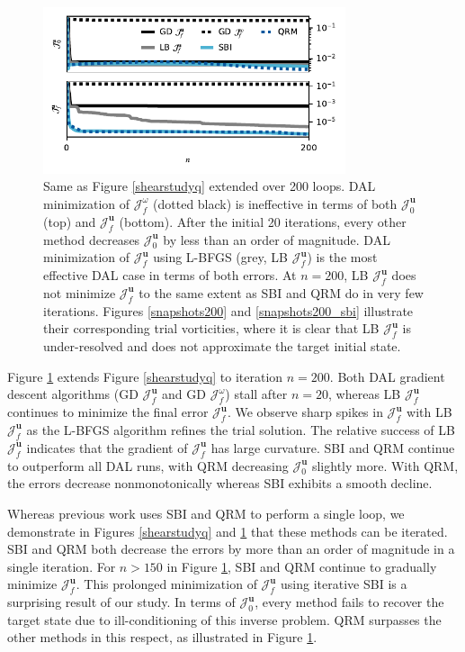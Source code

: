 \documentclass[%
 reprint,
 amsmath,amssymb,
 aps,
 pre,
]{revtex4-2}
\renewcommand{\vec}[1]{\boldsymbol{#1}}
\newcommand{\JUo}{\mathcal{J}^{\vec{u}}_0}
\newcommand{\JUf}{\mathcal{J}^{\vec{u}}_f}
\newcommand{\Jwf}{\mathcal{J}^{\omega}_f}
\begin{document}
\begin{figure}
  \includegraphics[width=3.5in]{PLT200DQ/both.pdf}
  \caption{Same as Figure \ref{shearstudyq} extended over 200 loops. 
  DAL minimization of $\Jwf$ (dotted black) is ineffective in terms of both $\JUo$ (top) and $\JUf$ (bottom).
  After the initial 20 iterations, every other method decreases $\JUo$ by less than an order of magnitude.
  DAL minimization of $\JUf$ using L-BFGS (grey, LB $\JUf$) is the most effective DAL case in terms of both errors.
  At $n=200$, LB $\JUf$ does not minimize $\JUf$ to the same extent as SBI and QRM do in very few iterations.
  Figures \ref{snapshots200} and \ref{snapshots200_sbi} illustrate their corresponding trial vorticities, where it is clear that LB $\JUf$ is under-resolved and does not approximate the target initial state.
  }
  \label{shearstudyq2}
\end{figure}

Figure \ref{shearstudyq2} extends Figure \ref{shearstudyq} to iteration $n=200$.
Both DAL gradient descent algorithms (GD $\JUf$ and GD $\Jwf$) stall after $n=20$, whereas LB $\JUf$ continues to minimize the final error $\JUf$.
We observe sharp spikes in $\JUf$ with LB $\JUf$ as the L-BFGS algorithm refines the trial solution.
The relative success of LB $\JUf$ indicates that the gradient of $\JUf$ has large curvature.
SBI and QRM continue to outperform all DAL runs, with QRM decreasing $\JUo$ slightly more.
With QRM, the errors decrease nonmonotonically whereas SBI exhibits a smooth decline.

Whereas previous work uses SBI and QRM to perform a single loop, we demonstrate in Figures \ref{shearstudyq} and \ref{shearstudyq2} that these methods can be iterated.
SBI and QRM both decrease the errors by more than an order of magnitude in a single iteration.
For $n>150$ in Figure \ref{shearstudyq2}, SBI and QRM continue to gradually minimize $\JUf$.
This prolonged minimization of $\JUf$ using iterative SBI is a surprising result of our study.
In terms of $\JUo$, every method fails to recover the target state due to ill-conditioning of this inverse problem.
QRM surpasses the other methods in this respect, as illustrated in Figure \ref{shearstudyq2}.
\end{document}
